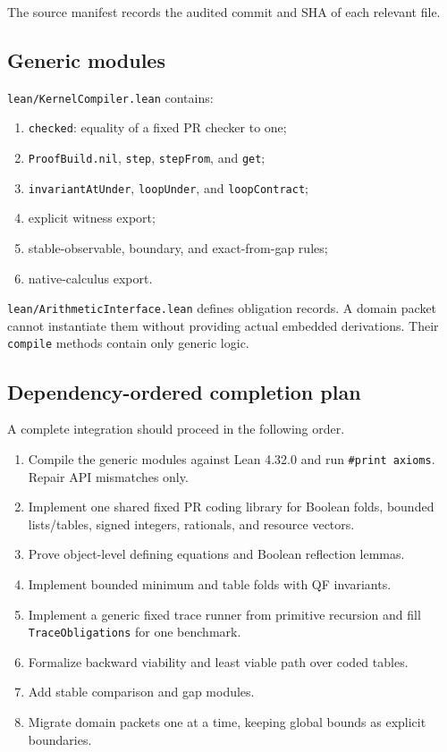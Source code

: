 \documentclass[11pt]{article}
\begin{document}
The source manifest records the audited commit and SHA of each relevant file.

\subsection{Generic modules}

\texttt{lean/KernelCompiler.lean} contains:

\begin{enumerate}
\item \texttt{checked}: equality of a fixed PR checker to one;
\item \texttt{ProofBuild.nil}, \texttt{step}, \texttt{stepFrom}, and
      \texttt{get};
\item \texttt{invariantAtUnder}, \texttt{loopUnder}, and
      \texttt{loopContract};
\item explicit witness export;
\item stable-observable, boundary, and exact-from-gap rules;
\item native-calculus export.
\end{enumerate}

\texttt{lean/ArithmeticInterface.lean} defines obligation records.  A domain
packet cannot instantiate them without providing actual embedded derivations.
Their \texttt{compile} methods contain only generic logic.

\subsection{Dependency-ordered completion plan}

A complete integration should proceed in the following order.

\begin{enumerate}
\item Compile the generic modules against Lean 4.32.0 and run
      \texttt{\#print axioms}.  Repair API mismatches only.
\item Implement one shared fixed PR coding library for Boolean folds, bounded
      lists/tables, signed integers, rationals, and resource vectors.
\item Prove object-level defining equations and Boolean reflection lemmas.
\item Implement bounded minimum and table folds with QF invariants.
\item Implement a generic fixed trace runner from primitive recursion and fill
      \texttt{TraceObligations} for one benchmark.
\item Formalize backward viability and least viable path over coded tables.
\item Add stable comparison and gap modules.
\item Migrate domain packets one at a time, keeping global bounds as explicit
      boundaries.
\end{enumerate}
\end{document}
